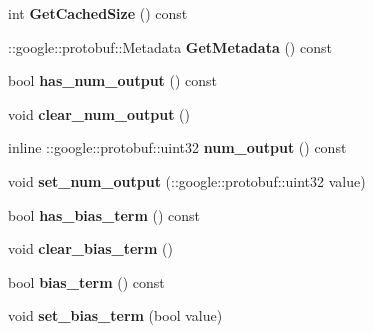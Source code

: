 \begin{DoxyCompactItemize}
int {\bfseries Get\+Cached\+Size} () const
\item 
\mbox{\label{classcaffe_1_1_convolution_parameter_ad5194dbb3558d87cd025b8eb9738c6e2}} 
\+::google\+::protobuf\+::\+Metadata {\bfseries Get\+Metadata} () const
\item 
\mbox{\label{classcaffe_1_1_convolution_parameter_a578e93d9d6bd6fb5fed521bbc12b4ef4}} 
bool {\bfseries has\+\_\+num\+\_\+output} () const
\item 
\mbox{\label{classcaffe_1_1_convolution_parameter_a1efd3e9fcd3ab5a78ac809dd2696af06}} 
void {\bfseries clear\+\_\+num\+\_\+output} ()
\item 
\mbox{\label{classcaffe_1_1_convolution_parameter_a5a5944ce4bc68ebaa840cbb3c460f31f}} 
inline \+::google\+::protobuf\+::uint32 {\bfseries num\+\_\+output} () const
\item 
\mbox{\label{classcaffe_1_1_convolution_parameter_a21e1ab8030050ccf77d5e1ef1f334d63}} 
void {\bfseries set\+\_\+num\+\_\+output} (\+::google\+::protobuf\+::uint32 value)
\item 
\mbox{\label{classcaffe_1_1_convolution_parameter_a59bd05e3cf9de60b728478210966eb2a}} 
bool {\bfseries has\+\_\+bias\+\_\+term} () const
\item 
\mbox{\label{classcaffe_1_1_convolution_parameter_a137d53c77b940335d368cfd7405b69b0}} 
void {\bfseries clear\+\_\+bias\+\_\+term} ()
\item 
\mbox{\label{classcaffe_1_1_convolution_parameter_a351547b43ed3367b94c097729db70752}} 
bool {\bfseries bias\+\_\+term} () const
\item 
\mbox{\label{classcaffe_1_1_convolution_parameter_abfec019e40e28ab60889ac5c203d3698}} 
void {\bfseries set\+\_\+bias\+\_\+term} (bool value)
\item 
\mbox{\label{classcaffe_1_1_convolution_parameter_a8810cea9da981944597dc10844a32ab6}} 

\end{DoxyCompactItemize}
